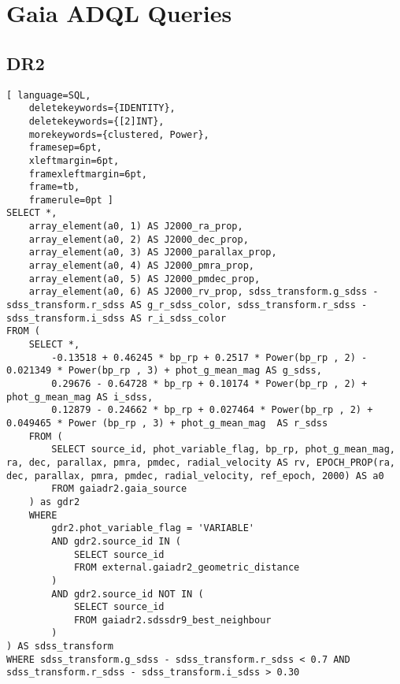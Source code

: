 \chapter{Gaia ADQL Queries} \label{apendice:gaiaAdql}

\section{DR2} \label{apendice:gaiaAdql:dr2}
\begin{lstlisting}[ language=SQL,
	deletekeywords={IDENTITY},
	deletekeywords={[2]INT},
	morekeywords={clustered, Power},
	framesep=6pt,
	xleftmargin=6pt,
	framexleftmargin=6pt,
	frame=tb,
	framerule=0pt ]
SELECT *, 
	array_element(a0, 1) AS J2000_ra_prop,
	array_element(a0, 2) AS J2000_dec_prop,
	array_element(a0, 3) AS J2000_parallax_prop,
	array_element(a0, 4) AS J2000_pmra_prop,
	array_element(a0, 5) AS J2000_pmdec_prop,
	array_element(a0, 6) AS J2000_rv_prop, sdss_transform.g_sdss - sdss_transform.r_sdss AS g_r_sdss_color, sdss_transform.r_sdss - sdss_transform.i_sdss AS r_i_sdss_color
FROM (
	SELECT *,
		-0.13518 + 0.46245 * bp_rp + 0.2517 * Power(bp_rp , 2) - 0.021349 * Power(bp_rp , 3) + phot_g_mean_mag AS g_sdss,
		0.29676 - 0.64728 * bp_rp + 0.10174 * Power(bp_rp , 2) + phot_g_mean_mag AS i_sdss,
		0.12879 - 0.24662 * bp_rp + 0.027464 * Power(bp_rp , 2) +	0.049465 * Power (bp_rp , 3) + phot_g_mean_mag	AS r_sdss
	FROM (
		SELECT source_id, phot_variable_flag, bp_rp, phot_g_mean_mag, ra, dec, parallax, pmra, pmdec, radial_velocity AS rv, EPOCH_PROP(ra, dec, parallax, pmra, pmdec, radial_velocity, ref_epoch, 2000) AS a0
		FROM gaiadr2.gaia_source
	) as gdr2
	WHERE
		gdr2.phot_variable_flag = 'VARIABLE'
		AND gdr2.source_id IN (
			SELECT source_id 
			FROM external.gaiadr2_geometric_distance
		)
		AND gdr2.source_id NOT IN (
			SELECT source_id 
			FROM gaiadr2.sdssdr9_best_neighbour
		)
) AS sdss_transform
WHERE sdss_transform.g_sdss - sdss_transform.r_sdss < 0.7 AND sdss_transform.r_sdss - sdss_transform.i_sdss > 0.30
\end{lstlisting}

